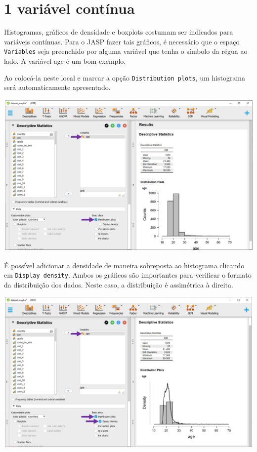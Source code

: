 \documentclass[
]{book}
\begin{document}
\hypertarget{variuxe1vel-contuxednua-1}{%
\section{1 variável contínua}\label{variuxe1vel-contuxednua-1}}

Histogramas, gráficos de densidade e boxplots costumam ser indicados
para variáveis contínuas. Para o JASP fazer tais gráficos, é necessário
que o espaço \texttt{Variables} seja preenchido por alguma variável que
tenha o símbolo da régua ao lado. A variável age é um bom exemplo.

Ao colocá-la neste local e marcar a opção \texttt{Distribution\ plots},
um histograma será automaticamente apresentado.

\includegraphics{./img/cap_desc_jasp_grafico_histograma.png}

É possível adicionar a densidade de maneira sobreposta ao histograma
clicando em \texttt{Display\ density}. Ambos os gráficos são importantes
para verificar o formato da distribuição dos dados. Neste caso, a
distribuição é assimétrica à direita.

\includegraphics{./img/cap_desc_jasp_grafico_densidade.png}
\end{document}
